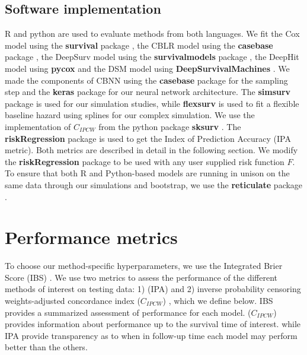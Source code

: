 \documentclass[APA,LATO1COL]{WileyNJD-v2}
\begin{document}
\hypertarget{software-implementation}{%
\subsection{Software implementation}\label{software-implementation}}

R \citep{Rsoft} and python \citep{py} are used to evaluate methods from
both languages. We fit the Cox model using the \textbf{survival} package
\citep{survpkg}, the CBLR model using the \textbf{casebase} package
\citep{cbpkg}, the DeepSurv model using the \textbf{survivalmodels}
package \citep{survmods}, the DeepHit model using \textbf{pycox}
\citep{lee2018DeepHit} and the DSM model using
\textbf{DeepSurvivalMachines} \citep{dsmPaper}. We made the components
of CBNN using the \textbf{casebase} package for the sampling step and
the \textbf{keras} \citep{keras} package for our neural network
architecture. The \textbf{simsurv} package \citep{simsurv} is used for
our simulation studies, while \textbf{flexsurv} \citep{flexsurv} is used
to fit a flexible baseline hazard using splines for our complex
simulation. We use the implementation of \(C_{IPCW}\) from the python
package \textbf{sksurv} \citep{sksurv}. The \textbf{riskRegression}
package \citep{riskRegression} is used to get the Index of Prediction
Accuracy (IPA metric). Both metrics are described in detail in the
following section. We modify the \textbf{riskRegression} package to be
used with any user supplied risk function \(F\). To ensure that both R
and Python-based models are running in unison on the same data through
our simulations and bootstrap, we use the \textbf{reticulate} package
\citep{reticulate}.







\hypertarget{performance-metrics}{%
\section{Performance metrics}\label{performance-metrics}}

To choose our method-specific hyperparameters, we use the Integrated 
Brier Score (IBS) \citep{graf1999}. We use two metrics to assess the 
performance of the different methods of interest on testing data: 1) (IPA) 
\citep{kattan2018index} and 2) inverse probability
censoring weights-adjusted concordance index (\(C_{IPCW}\))
\citep{uno2011}, which we define below. IBS provides a summarized assessment
of performance for each model. (\(C_{IPCW}\)) provides information
about performance up to the survival time of interest. while IPA provide transparency
as to when in follow-up time each model may
perform better than the others.
\end{document}
